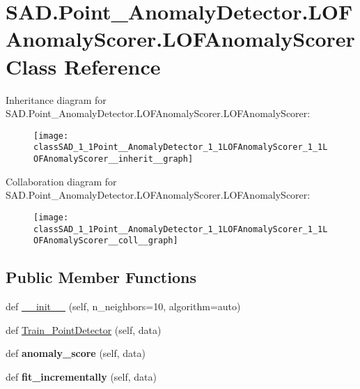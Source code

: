 \hypertarget{classSAD_1_1Point__AnomalyDetector_1_1LOFAnomalyScorer_1_1LOFAnomalyScorer}{}\section{S\+A\+D.\+Point\+\_\+\+Anomaly\+Detector.\+L\+O\+F\+Anomaly\+Scorer.\+L\+O\+F\+Anomaly\+Scorer Class Reference}
\label{classSAD_1_1Point__AnomalyDetector_1_1LOFAnomalyScorer_1_1LOFAnomalyScorer}


Inheritance diagram for S\+A\+D.\+Point\+\_\+\+Anomaly\+Detector.\+L\+O\+F\+Anomaly\+Scorer.\+L\+O\+F\+Anomaly\+Scorer\+:\nopagebreak
\begin{figure}[H]
\begin{center}
\leavevmode
\texttt{[image: classSAD\_1\_1Point\_\_AnomalyDetector\_1\_1LOFAnomalyScorer\_1\_1LOFAnomalyScorer\_\_inherit\_\_graph]}
\end{center}
\end{figure}


Collaboration diagram for S\+A\+D.\+Point\+\_\+\+Anomaly\+Detector.\+L\+O\+F\+Anomaly\+Scorer.\+L\+O\+F\+Anomaly\+Scorer\+:\nopagebreak
\begin{figure}[H]
\begin{center}
\leavevmode
\texttt{[image: classSAD\_1\_1Point\_\_AnomalyDetector\_1\_1LOFAnomalyScorer\_1\_1LOFAnomalyScorer\_\_coll\_\_graph]}
\end{center}
\end{figure}
\subsection*{Public Member Functions}
\begin{DoxyCompactItemize}
\item 
def \hyperlink{classSAD_1_1Point__AnomalyDetector_1_1LOFAnomalyScorer_1_1LOFAnomalyScorer_a901c20153f333b511bcfae6fb1c997a3}{\+\_\+\+\_\+init\+\_\+\+\_\+} (self, n\+\_\+neighbors=10, algorithm=\textquotesingle{}auto\textquotesingle{})
\item 
def \hyperlink{classSAD_1_1Point__AnomalyDetector_1_1LOFAnomalyScorer_1_1LOFAnomalyScorer_a1d4a77f8866cca6ed19db1f92ae13fd0}{Train\+\_\+\+Point\+Detector} (self, data)
\item 
def {\bfseries anomaly\+\_\+score} (self, data)\hypertarget{classSAD_1_1Point__AnomalyDetector_1_1LOFAnomalyScorer_1_1LOFAnomalyScorer_ad67e6c6a4abc10b5d9bfe54c066e94e4}{}\label{classSAD_1_1Point__AnomalyDetector_1_1LOFAnomalyScorer_1_1LOFAnomalyScorer_ad67e6c6a4abc10b5d9bfe54c066e94e4}

\item 
def {\bfseries fit\+\_\+incrementally} (self, data)\hypertarget{classSAD_1_1Point__AnomalyDetector_1_1LOFAnomalyScorer_1_1LOFAnomalyScorer_a09c724739e45504942bc135104077cc6}{}\label{classSAD_1_1Point__AnomalyDetector_1_1LOFAnomalyScorer_1_1LOFAnomalyScorer_a09c724739e45504942bc135104077cc6}

\end{DoxyCompactItemize}
